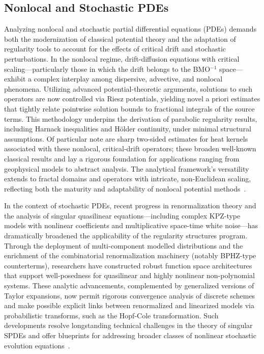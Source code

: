 \documentclass[sigconf]{acmart}
\begin{document}
\subsection{Nonlocal and Stochastic PDEs}

Analyzing nonlocal and stochastic partial differential equations (PDEs) demands both the modernization of classical potential theory and the adaptation of regularity tools to account for the effects of critical drift and stochastic perturbations. In the nonlocal regime, drift-diffusion equations with critical scaling—particularly those in which the drift belongs to the BMO$^{-1}$ space—exhibit a complex interplay among dispersive, advective, and nonlocal phenomena. Utilizing advanced potential-theoretic arguments, solutions to such operators are now controlled via Riesz potentials, yielding novel a priori estimates that tightly relate pointwise solution bounds to fractional integrals of the source terms. This methodology underpins the derivation of parabolic regularity results, including Harnack inequalities and Hölder continuity, under minimal structural assumptions. Of particular note are sharp two-sided estimates for heat kernels associated with these nonlocal, critical-drift operators; these broaden well-known classical results and lay a rigorous foundation for applications ranging from geophysical models to abstract analysis. The analytical framework's versatility extends to fractal domains and operators with intricate, non-Euclidean scaling, reflecting both the maturity and adaptability of nonlocal potential methods~\cite{ref95}.

In the context of stochastic PDEs, recent progress in renormalization theory and the analysis of singular quasilinear equations—including complex KPZ-type models with nonlinear coefficients and multiplicative space-time white noise—has dramatically broadened the applicability of the regularity structures program. Through the deployment of multi-component modelled distributions and the enrichment of the combinatorial renormalization machinery (notably BPHZ-type counterterms), researchers have constructed robust function space architectures that support well-posedness for quasilinear and highly nonlinear non-polynomial systems. These analytic advancements, complemented by generalized versions of Taylor expansions, now permit rigorous convergence analysis of discrete schemes and make possible explicit links between renormalized and linearized models via probabilistic transforms, such as the Hopf-Cole transformation. Such developments resolve longstanding technical challenges in the theory of singular SPDEs and offer blueprints for addressing broader classes of nonlinear stochastic evolution equations~\cite{ref94}.
\end{document}
